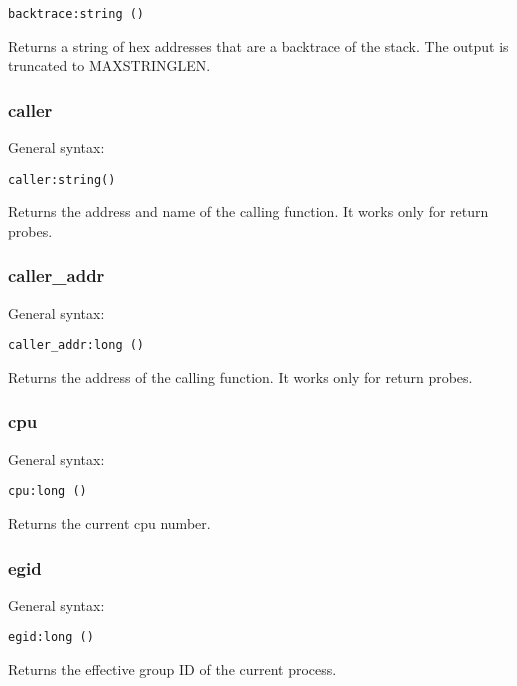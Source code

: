 \documentclass[twoside,english]{article}
\newenvironment{vindent}
{\begin{list}{}{\setlength{\listparindent}{6pt}}
\item[]}
{\end{list}}
\begin{document}
\begin{vindent}
\begin{verbatim}
backtrace:string ()
\end{verbatim}
\end{vindent}
Returns a string of hex addresses that are a backtrace of the
stack. The output is truncated to MAXSTRINGLEN.

\subsubsection{caller}
General syntax:

\begin{vindent}
\begin{verbatim}
caller:string()
\end{verbatim}
\end{vindent}
Returns the address and name of the calling function. It works
only for return probes.

\subsubsection{caller\_addr}
General syntax:

\begin{vindent}
\begin{verbatim}
caller_addr:long ()
\end{verbatim}
\end{vindent}
Returns the address of the calling function. It works only
for return probes.


\subsubsection{cpu}
General syntax:

\begin{vindent}
\begin{verbatim}
cpu:long ()
\end{verbatim}
\end{vindent}
Returns the current cpu number.


\subsubsection{egid}
General syntax:

\begin{vindent}
\begin{verbatim}
egid:long ()
\end{verbatim}
\end{vindent}
Returns the effective group ID of the current process.
\end{document}
